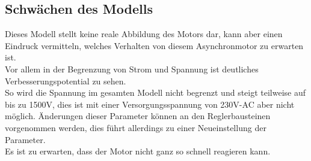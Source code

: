 \subsection{Schwächen des Modells}
Dieses Modell stellt keine reale Abbildung des Motors dar, kann aber einen Eindruck vermitteln, welches Verhalten von diesem Asynchronmotor zu erwarten ist.\\
Vor allem in der Begrenzung von Strom und Spannung ist deutliches Verbesserungspotential zu sehen.\\
So wird die Spannung im gesamten Modell nicht begrenzt und steigt teilweise auf bis zu 1500V, dies ist mit einer Versorgungsspannung von 230V-AC aber nicht möglich. Änderungen dieser Parameter können an den Reglerbausteinen vorgenommen werden, dies führt allerdings zu einer Neueinstellung der Parameter.\\ Es ist zu erwarten, dass der Motor nicht ganz so schnell reagieren kann.